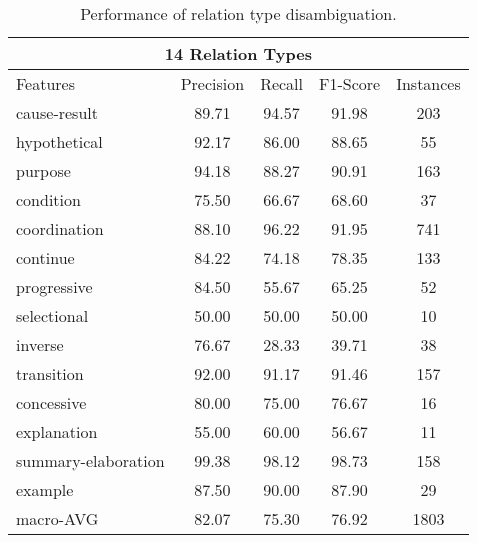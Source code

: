 \begin{table}[ht]
\begin{tabular}{|l|c|c|c|c|}
\multicolumn{5}{|c|}{14 Relation Types}                                             \\ \hline
    Features            &     Precision &     Recall &     F1-Score &     Instances \\ \hline
    cause-result        &     89.71     &     94.57  &     91.98    &     203       \\ \hline
    hypothetical        &     92.17     &     86.00  &     88.65    &     55        \\ \hline
    purpose             &     94.18     &     88.27  &     90.91    &     163       \\ \hline
    condition           &     75.50     &     66.67  &     68.60    &     37        \\ \hline
    coordination        &     88.10     &     96.22  &     91.95    &     741       \\ \hline
    continue            &     84.22     &     74.18  &     78.35    &     133       \\ \hline
    progressive         &     84.50     &     55.67  &     65.25    &     52        \\ \hline
    selectional         &     50.00     &     50.00  &     50.00    &     10        \\ \hline
    inverse             &     76.67     &     28.33  &     39.71    &     38        \\ \hline
    transition          &     92.00     &     91.17  &     91.46    &     157       \\ \hline
    concessive          &     80.00     &     75.00  &     76.67    &     16        \\ \hline
    explanation         &     55.00     &     60.00  &     56.67    &     11        \\ \hline
    summary-elaboration &     99.38     &     98.12  &     98.73    &     158       \\ \hline
    example             &     87.50     &     90.00  &     87.90    &     29        \\ \hline
    macro-AVG           &     82.07     &     75.30  &     76.92    &     1803      \\ \hline

\end{tabular}
\caption{\label{t:sense-types} Performance of relation type
disambiguation. }
\end{table}
